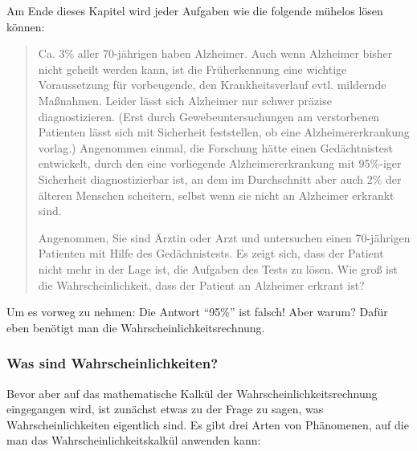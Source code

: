 Am Ende dieses Kapitel wird jeder Aufgaben wie die folgende mühelos lösen
können:

\begin{quotation}
 Ca. 3\% aller 70-jährigen haben Alzheimer. Auch
wenn Alzheimer bisher nicht geheilt werden kann, ist die
Früherkennung eine wichtige Voraussetzung für vorbeugende, den
Krankheitsverlauf evtl. mildernde Maßnahmen. Leider lässt sich
Alzheimer nur schwer präzise diagnostizieren. (Erst durch
Gewebeuntersuchungen am verstorbenen Patienten lässt sich mit
Sicherheit feststellen, ob eine Alzheimererkrankung vorlag.)
Angenommen einmal, die Forschung hätte einen Gedächtnistest
entwickelt, durch den eine vorliegende Alzheimererkrankung
mit 95\%-iger Sicherheit diagnostizierbar ist, an dem im
Durchschnitt aber auch 2\% der älteren Menschen scheitern, selbst wenn sie
nicht an Alzheimer erkrankt sind.

Angenommen, Sie sind Ärztin oder Arzt und untersuchen einen
70-jährigen Patienten mit Hilfe des Gedächnistests. Es zeigt sich, dass
der Patient nicht mehr in der Lage ist, die Aufgaben des Tests zu lösen. Wie
groß ist die Wahrscheinlichkeit, dass der Patient an Alzheimer erkrant ist?
\end{quotation}

Um es vorweg zu nehmen: Die Antwort "`95\%"' ist falsch! Aber warum? Dafür
eben benötigt man die Wahrscheinlichkeitsrechnung.

\subsubsection{Was sind Wahrscheinlichkeiten?}
Bevor aber auf das mathematische Kalkül der Wahrscheinlichkeitsrechnung
eingegangen wird, ist zunächst etwas zu der Frage zu sagen, was
Wahrscheinlichkeiten eigentlich sind. Es gibt drei Arten von Phänomenen, auf die
man das Wahrscheinlichkeitskalkül anwenden kann:

